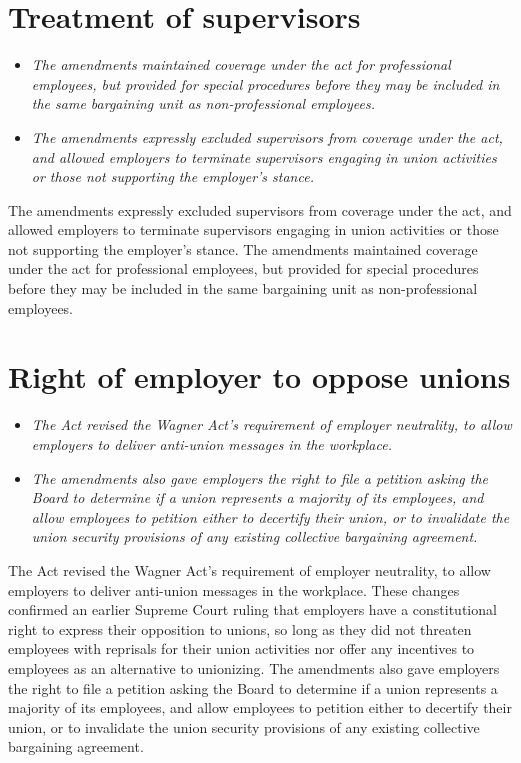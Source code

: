 \section{Treatment of supervisors}\label{treatment-of-supervisors}

\begin{itemize}
\item
  \emph{The amendments maintained coverage under the act for
  professional employees, but provided for special procedures before
  they may be included in the same bargaining unit as non-professional
  employees.}
\item
  \emph{The amendments expressly excluded supervisors from coverage
  under the act, and allowed employers to terminate supervisors engaging
  in union activities or those not supporting the employer's stance.}
\end{itemize}

The amendments expressly excluded supervisors from coverage under the
act, and allowed employers to terminate supervisors engaging in union
activities or those not supporting the employer's stance. The amendments
maintained coverage under the act for professional employees, but
provided for special procedures before they may be included in the same
bargaining unit as non-professional employees.

\section{Right of employer to oppose
unions}\label{right-of-employer-to-oppose-unions}

\begin{itemize}
\item
  \emph{The Act revised the Wagner Act's requirement of employer
  neutrality, to allow employers to deliver anti-union messages in the
  workplace.}
\item
  \emph{The amendments also gave employers the right to file a petition
  asking the Board to determine if a union represents a majority of its
  employees, and allow employees to petition either to decertify their
  union, or to invalidate the union security provisions of any existing
  collective bargaining agreement.}
\end{itemize}

The Act revised the Wagner Act's requirement of employer neutrality, to
allow employers to deliver anti-union messages in the workplace. These
changes confirmed an earlier Supreme Court ruling that employers have a
constitutional right to express their opposition to unions, so long as
they did not threaten employees with reprisals for their union
activities nor offer any incentives to employees as an alternative to
unionizing. The amendments also gave employers the right to file a
petition asking the Board to determine if a union represents a majority
of its employees, and allow employees to petition either to decertify
their union, or to invalidate the union security provisions of any
existing collective bargaining agreement.

